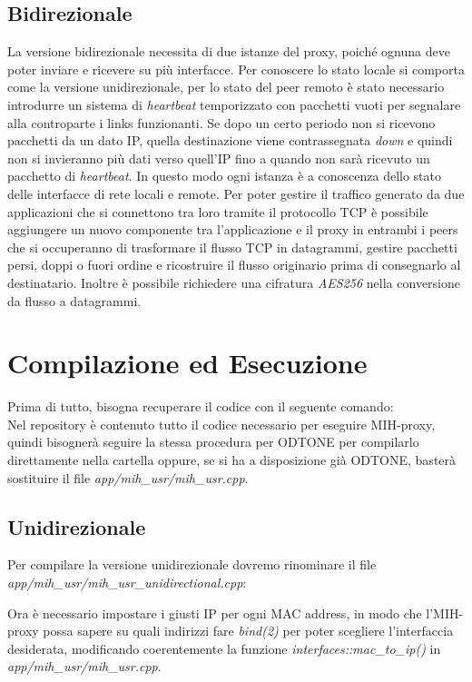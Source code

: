 \subsection{Bidirezionale}
La versione bidirezionale necessita di due istanze del proxy, poiché ognuna deve poter inviare e ricevere su più interfacce. Per conoscere lo stato locale si comporta come la versione unidirezionale, per lo stato del peer remoto è stato necessario introdurre un sistema di {\em heartbeat} temporizzato con pacchetti vuoti per segnalare alla controparte i links funzionanti. Se dopo un certo periodo non si ricevono pacchetti da un dato IP, quella destinazione viene contrassegnata {\em down} e quindi non si invieranno più dati verso quell'IP fino a quando non sarà ricevuto un pacchetto di {\em heartbeat}. In questo modo ogni istanza è a conoscenza dello stato delle interfacce di rete locali e remote. Per poter gestire il traffico generato da due applicazioni che si connettono tra loro tramite il protocollo TCP è possibile aggiungere un nuovo componente tra l'applicazione e il proxy in entrambi i peers che si occuperanno di trasformare il flusso TCP in datagrammi, gestire pacchetti persi, doppi o fuori ordine e ricostruire il flusso originario prima di consegnarlo al destinatario. Inoltre è possibile richiedere una cifratura {\em AES256} nella conversione da flusso a datagrammi.
\section{Compilazione ed Esecuzione}
Prima di tutto, bisogna recuperare il codice con il seguente comando:\\
Nel repository è contenuto tutto il codice necessario per eseguire MIH-proxy, quindi bisognerà seguire la stessa procedura per ODTONE per compilarlo direttamente nella cartella oppure, se si ha a disposizione già ODTONE, basterà sostituire il file {\em app/mih\_usr/mih\_usr.cpp}.

\subsection{Unidirezionale}
Per compilare la versione unidirezionale dovremo rinominare il file {\em app/mih\_usr/mih\_usr\_unidirectional.cpp}:

Ora è necessario impostare i giusti IP per ogni MAC address, in modo che l'MIH-proxy possa sapere su quali indirizzi fare {\em bind(2)} per poter scegliere l'interfaccia desiderata, modificando coerentemente la funzione {\em interfaces::mac\_to\_ip()} in {\em app/mih\_usr/mih\_usr.cpp}.

